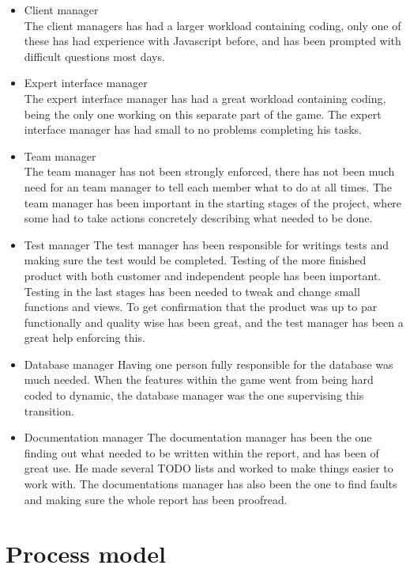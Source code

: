 \begin{itemize}
	\item Client manager\\
The client managers has had a larger workload containing coding, only one of these has had experience with Javascript before, and has been prompted with difficult questions most days.
	\item Expert interface manager\\
The expert interface manager has had a great workload containing coding, being the only one working on this separate part of the game. The expert interface manager has had small to no problems completing his tasks.
	\item Team manager\\
The team manager has not been strongly enforced, there has not been much need for an team manager to tell each member what to do at all times. The team manager has been important in the starting stages of the project, where some had to take actions concretely describing what needed to be done. 
	\item Test manager %
The test manager has been responsible for writings tests and making sure the test would be completed. Testing of the more finished product with both customer and independent people has been important. Testing in the last stages has been needed to tweak and change small functions and views. To get confirmation that the product was up to par functionally and quality wise has been great, and the test manager has been a great help enforcing this.
	\item Database manager %
Having one person fully responsible for the database was much needed. When the features within the game went from being hard coded to dynamic, the database manager was the one supervising this transition. 
	\item Documentation manager %
The documentation manager has been the one finding out what needed to be written within the report, and has been of great use. He made several TODO lists and worked to make things easier to work with. The documentations manager has also been the one to find faults and making sure the whole report has been proofread.
\end{itemize}


\section{Process model}

